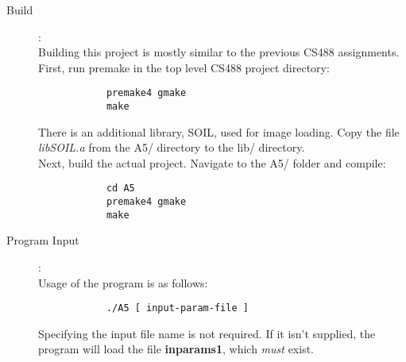 \documentclass{article}
\begin{document}
	\begin{description}
	\item[Build]:\\
		Building this project is mostly similar to the previous CS488 assignments. First, run premake in the top level CS488 project directory:
		\begin{verbatim}
			premake4 gmake
			make
		\end{verbatim}
		There is an additional library, SOIL, used for image loading. Copy the file \textit{libSOIL.a} from the A5/ directory to the lib/ directory. \\
		Next, build the actual project. Navigate to the A5/ folder and compile:
		\begin{verbatim}
			cd A5
			premake4 gmake
			make
		\end{verbatim}

	\item[Program Input]:\\
		Usage of the program is as follows:
		\begin{verbatim}
			./A5 [ input-param-file ]
		\end{verbatim}
		Specifying the input file name is not required. If it isn't supplied, the program will load the file \textbf{inparams1}, which \textit{must} exist.


\end{description}
\end{document}
